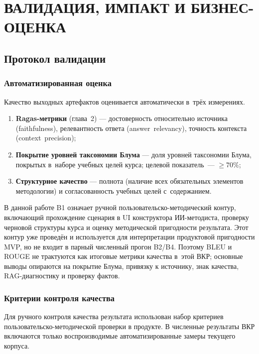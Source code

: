 \chapter{ВАЛИДАЦИЯ, ИМПАКТ И БИЗНЕС-ОЦЕНКА}

\section{Протокол валидации}

\subsection{Автоматизированная оценка}

Качество выходных артефактов оценивается автоматически
в~трёх измерениях.

\begin{enumerate}
  \item \textbf{Ragas-метрики} (глава~2) — достоверность относительно
    источника (faithfulness), релевантность ответа (answer~relevancy),
    точность контекста (context~precision);
  \item \textbf{Покрытие уровней таксономии Блума} — доля уровней таксономии Блума,
    покрытых в~наборе учебных целей курса; целевой показатель~— $\geq 70\%$;
  \item \textbf{Структурное качество} — полнота (наличие всех обязательных
    элементов методологии) и согласованность учебных целей с~содержанием.
\end{enumerate}

В данной работе B1 означает ручной пользовательско-методический контур,
включающий прохождение сценария в UI конструктора ИИ-методиста, проверку черновой
структуры курса и оценку методической пригодности результата. Этот контур
уже проведён и используется для интерпретации продуктовой пригодности MVP,
но не входит в парный численный прогон B2/B4. Поэтому BLEU и ROUGE не
трактуются как итоговые метрики качества в~этой ВКР;
основные выводы опираются на покрытие Блума, привязку к источнику,
знак качества, RAG-диагностику и проверку фактов.

\subsection{Критерии контроля качества}

Для ручного контроля качества результата использован набор критериев
пользовательско-методической проверки в продукте. В численные результаты
ВКР включаются только воспроизводимые автоматизированные замеры текущего
корпуса.

